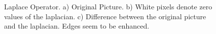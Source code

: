 \documentclass[11pt,a4paper]{article}
\begin{document}
\begin{figure}%
\centering
{}
\quad
{}
\quad
{}

\caption{Laplace Operator. a) Original Picture. b) White pixels denote zero values of the laplacian. c) Difference between the original picture and the laplacian. Edges seem to be enhanced.}%
\label{fig:lap}%
\end{figure}
\end{document}
